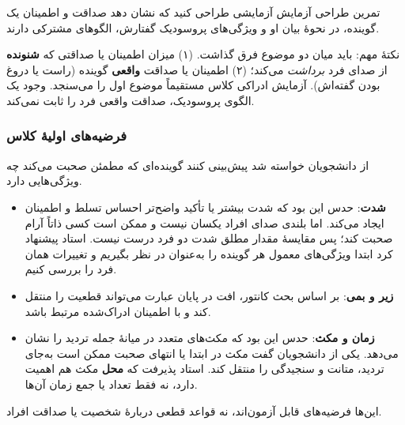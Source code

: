 \begin{assignmentbox}{تمرین طراحی آزمایش}
آزمایشی طراحی کنید که نشان دهد صداقت و اطمینان یک گوینده، در نحوهٔ بیان او و ویژگی‌های پروسودیک گفتارش، الگوهای مشترکی دارند.
\end{assignmentbox}

نکتهٔ مهم: باید میان دو موضوع فرق گذاشت. (۱) میزان اطمینان یا صداقتی که \textbf{شنونده} از صدای فرد \emph{برداشت} می‌کند؛ (۲) اطمینان یا صداقت \textbf{واقعی} گوینده (راست یا دروغ بودن گفته‌اش). آزمایش ادراکی کلاس مستقیماً موضوع اول را می‌سنجد. وجود یک الگوی پروسودیک، صداقت واقعی فرد را ثابت نمی‌کند.

\subsubsection{فرضیه‌های اولیهٔ کلاس}
از دانشجویان خواسته شد پیش‌بینی کنند گوینده‌ای که مطمئن صحبت می‌کند چه ویژگی‌هایی دارد.
\begin{itemize}
  \item \textbf{شدت}: حدس این بود که شدت بیشتر یا تأکید واضح‌تر احساس تسلط و اطمینان ایجاد می‌کند. اما بلندی صدای افراد یکسان نیست و ممکن است کسی ذاتاً آرام صحبت کند؛ پس مقایسهٔ مقدار مطلق شدت دو فرد درست نیست. استاد پیشنهاد کرد ابتدا ویژگی‌های معمول هر گوینده را به‌عنوان  در نظر بگیریم و تغییرات همان فرد را بررسی کنیم.
  \item \textbf{زیر و بمی}: بر اساس بحث کانتور، افت  در پایان عبارت می‌تواند قطعیت را منتقل کند و با اطمینان ادراک‌شده مرتبط باشد.
  \item \textbf{زمان و مکث}: حدس این بود که مکث‌های متعدد در میانهٔ جمله تردید را نشان می‌دهد. یکی از دانشجویان گفت مکث در ابتدا یا انتهای صحبت ممکن است به‌جای تردید، متانت و سنجیدگی را منتقل کند. استاد پذیرفت که \textbf{محل} مکث هم اهمیت دارد، نه فقط تعداد یا جمع زمان آن‌ها.
\end{itemize}
این‌ها فرضیه‌های قابل آزمون‌اند، نه قواعد قطعی دربارهٔ شخصیت یا صداقت افراد.

